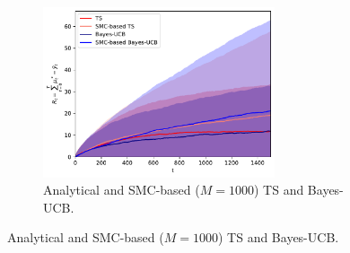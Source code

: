 \begin{figure}[!h]
	\centering
	\begin{subfigure}[b]{\textwidth}
		\centering
		\includegraphics[width=0.75\textwidth]{./fods_figs/static/bernoulli/A2/theta0.5_0.6_M1000_cumulative_regret}
		\caption{Analytical and SMC-based ($M=1000$) TS and Bayes-UCB.}
	\end{subfigure}
	

\end{figure}
